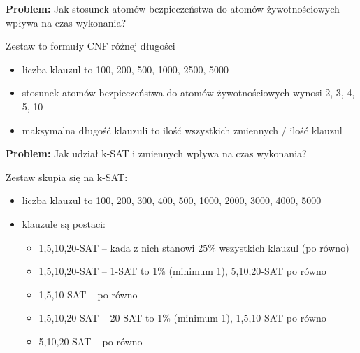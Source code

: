 \documentclass[a4paper,12pt]{article}
\begin{document}
\noindent
\textbf{Problem:} Jak stosunek atomów bezpieczeństwa do atomów żywotnościowych wpływa na czas wykonania?

Zestaw to formuły CNF różnej długości
\begin{itemize}
  \item liczba klauzul to 100, 200, 500, 1000, 2500, 5000
  \item stosunek atomów bezpieczeństwa do atomów żywotnościowych wynosi 2, 3, 4, 5, 10
  \item maksymalna długość klauzuli to ilość wszystkich zmiennych / ilość klauzul
\end{itemize}

\noindent
\textbf{Problem:} Jak udział k-SAT i zmiennych wpływa na czas wykonania?
\newline

Zestaw skupia się na k-SAT:
\begin{itemize}
  \item liczba klauzul to 100, 200, 300, 400, 500, 1000, 2000, 3000, 4000, 5000
  \item klauzule są postaci:
    \begin{itemize}
      \item 1,5,10,20-SAT -- kada z nich stanowi 25\% wszystkich klauzul (po równo)
      \item 1,5,10,20-SAT -- 1-SAT to 1\% (minimum 1), 5,10,20-SAT po równo
      \item 1,5,10-SAT -- po równo
      \item 1,5,10,20-SAT -- 20-SAT to 1\% (minimum 1), 1,5,10-SAT po równo
      \item 5,10,20-SAT -- po równo
    \end{itemize}
\end{itemize}

\end{document}
